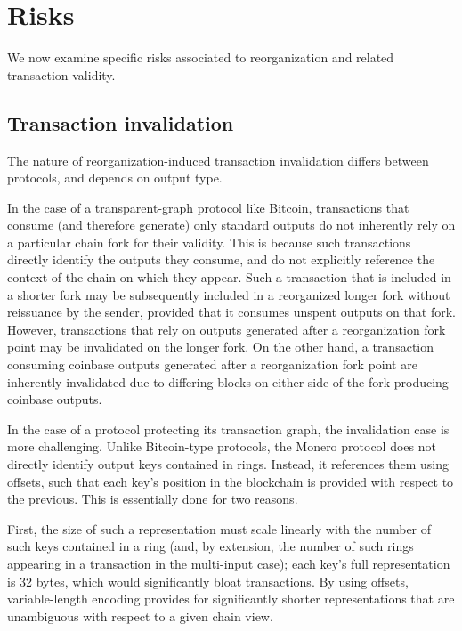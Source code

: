 \documentclass{article}
\theoremstyle{definition}
\begin{document}
\section{Risks}

We now examine specific risks associated to reorganization and related transaction validity.


\subsection{Transaction invalidation}

The nature of reorganization-induced transaction invalidation differs between protocols, and depends on output type.

In the case of a transparent-graph protocol like Bitcoin, transactions that consume (and therefore generate) only standard outputs do not inherently rely on a particular chain fork for their validity.
This is because such transactions directly identify the outputs they consume, and do not explicitly reference the context of the chain on which they appear.
Such a transaction that is included in a shorter fork may be subsequently included in a reorganized longer fork without reissuance by the sender, provided that it consumes unspent outputs on that fork.
However, transactions that rely on outputs generated after a reorganization fork point may be invalidated on the longer fork.
On the other hand, a transaction consuming coinbase outputs generated after a reorganization fork point are inherently invalidated due to differing blocks on either side of the fork producing coinbase outputs.

In the case of a protocol protecting its transaction graph, the invalidation case is more challenging.
Unlike Bitcoin-type protocols, the Monero protocol does not directly identify output keys contained in rings.
Instead, it references them using offsets, such that each key's position in the blockchain is provided with respect to the previous.
This is essentially done for two reasons.

First, the size of such a representation must scale linearly with the number of such keys contained in a ring (and, by extension, the number of such rings appearing in a transaction in the multi-input case); each key's full representation is 32 bytes, which would significantly bloat transactions.
By using offsets, variable-length encoding provides for significantly shorter representations that are unambiguous with respect to a given chain view.
\end{document}
